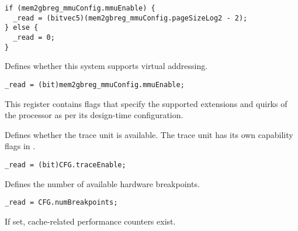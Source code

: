 \reset{*****}
\implementation{}
\begin{lstlisting}
if (mem2gbreg_mmuConfig.mmuEnable) {
  _read = (bitvec5)(mem2gbreg_mmuConfig.pageSizeLog2 - 2);
} else {
  _read = 0;
}
\end{lstlisting}

Defines whether this system supports virtual addressing.

\reset{*}
\implementation{}
\begin{lstlisting}
_read = (bit)mem2gbreg_mmuConfig.mmuEnable;
\end{lstlisting}


This register contains flags that specify the supported extensions and quirks
of the processor as per its design-time configuration.

Defines whether the trace unit is available. The trace unit has its own
capability flags in .

\reset{***}
\implementation{}
\begin{lstlisting}
_read = (bit)CFG.traceEnable;
\end{lstlisting}

Defines the number of available hardware breakpoints.

\reset{***}
\implementation{}
\begin{lstlisting}
_read = CFG.numBreakpoints;
\end{lstlisting}

If set, cache-related performance counters exist.

